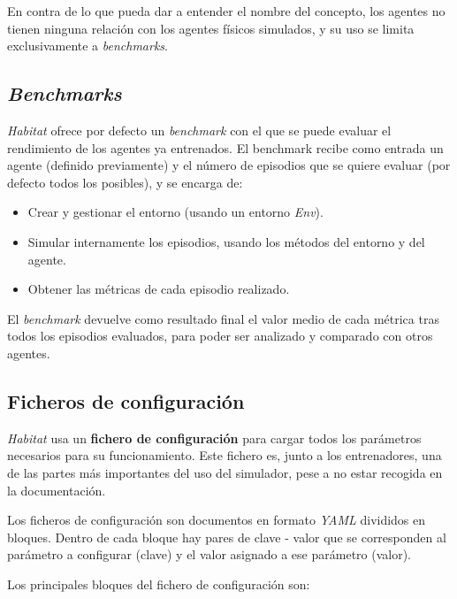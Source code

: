 En contra de lo que pueda dar a entender el nombre del concepto, los agentes no tienen ninguna relación con los agentes físicos simulados, y su uso se limita exclusivamente a \textit{benchmarks}.

\subsection{\textit{Benchmarks}}

\textit{Habitat} ofrece por defecto un \textit{benchmark} con el que se puede evaluar el rendimiento de los agentes ya entrenados. El benchmark recibe como entrada un agente (definido previamente) y el número de episodios que se quiere evaluar (por defecto todos los posibles), y se encarga de:

\begin{itemize}
	\item Crear y gestionar el entorno (usando un entorno \textit{Env}).
	\item Simular internamente los episodios, usando los métodos del entorno y del agente.
	\item Obtener las métricas de cada episodio realizado.
\end{itemize}

El \textit{benchmark} devuelve como resultado final el valor medio de cada métrica tras todos los episodios evaluados, para poder ser analizado y comparado con otros agentes.

\subsection{Ficheros de configuración}

\textit{Habitat} usa un \textbf{fichero de configuración} para cargar todos los parámetros necesarios para su funcionamiento. Este fichero es, junto a los entrenadores, una de las partes más importantes del uso del simulador, pese a no estar recogida en la documentación.

Los ficheros de configuración son documentos en formato \textit{YAML} \cite{yaml} divididos en bloques. Dentro de cada bloque hay pares de clave - valor que se corresponden al parámetro a configurar (clave) y el valor asignado a ese parámetro (valor).

Los principales bloques del fichero de configuración son:

